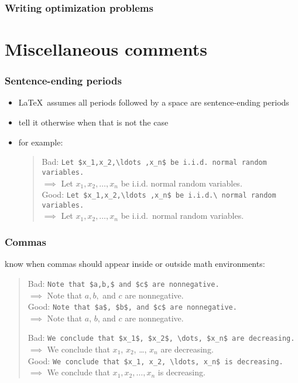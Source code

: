 \documentclass[usepdftitle=false]{beamer}
\begin{document}
\begin{frame}
    \frametitle{Writing optimization problems}

    

\end{frame}

\section{Miscellaneous comments}
\begin{frame}[fragile]
    \frametitle{Sentence-ending periods}

    \begin{itemize}\itemsep=12pt
        \item \LaTeX\ assumes all periods followed by a space are sentence-ending periods
        \item tell it otherwise when that is not the case
        \item for example:
            \begin{quote}
                Bad: \verb+Let $x_1,x_2,\ldots ,x_n$ be i.i.d. normal random variables.+\\
                \quad $\implies$ Let $x_1,x_2,\ldots ,x_n$ be i.i.d. normal random variables.\\
                Good: \verb+Let $x_1,x_2,\ldots ,x_n$ be i.i.d.\ normal random variables.+\\
                \quad $\implies$ Let $x_1,x_2,\ldots ,x_n$ be i.i.d.\ normal random variables.
            \end{quote}
    \end{itemize}
\end{frame}

\begin{frame}[fragile]
    \frametitle{Commas}

    know when commas should appear inside or outside math environments:
    \begin{quote}
        Bad: \verb+Note that $a,b,$ and $c$ are nonnegative.+\\
        \quad $\implies$ Note that $a,b,$ and $c$ are nonnegative.\\
        Good: \verb+Note that $a$, $b$, and $c$ are nonnegative.+\\
        \quad $\implies$ Note that $a$, $b$, and $c$ are nonnegative.

        Bad: \verb+We conclude that $x_1$, $x_2$, \dots, $x_n$ are decreasing.+\\
        \quad $\implies$ We conclude that $x_1$, $x_2$, \dots, $x_n$ are decreasing.\\
        Good: \verb+We conclude that $x_1, x_2, \ldots, x_n$ is decreasing.+\\
        \quad $\implies$ We conclude that $x_1, x_2, \ldots, x_n$ is decreasing.
    \end{quote}
\end{frame}
\end{document}
